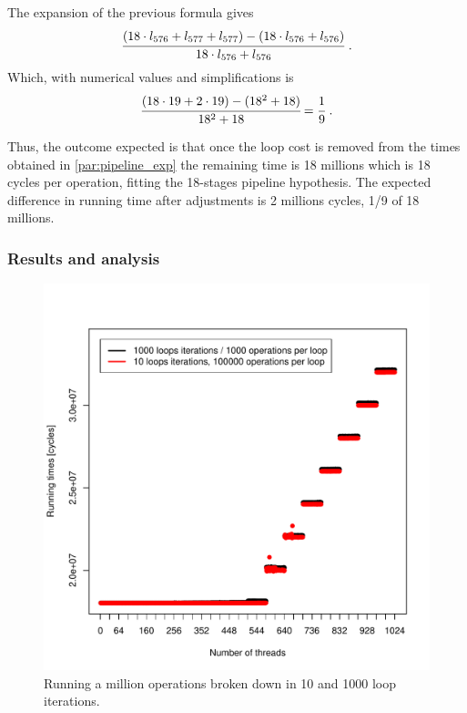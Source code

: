 \documentclass{report}
\def \scalingfactor{.8}
\begin{document}
    The expansion of the previous formula gives
    \[ \cfrac{(18\cdot l_{576} + l_{577} + l_{577}) - (18\cdot l_{576} + l_{576})}{18\cdot l_{576} + l_{576}} \text{  .}\]
    Which, with numerical values and simplifications is
    \[ \cfrac{(18\cdot 19 + 2\cdot 19) - (18^2 + 18)}{18^2 + 18} = \cfrac{1}{9}\text{  .}\] 

    Thus, the outcome expected is that once the loop cost is removed from the 
    times obtained in \ref{par:pipeline_exp} the remaining time is 18 millions
    which is 18 cycles per operation, fitting the 18-stages pipeline hypothesis.
    The expected difference in running time after adjustments is 2 millions cycles,
    1/9 of 18 millions.

	\subsubsection{Results and analysis}
    \begin{figure}[H]
		\centering
		\vspace{-20pt}
    			\includegraphics[width=\scalingfactor\linewidth]{"graphics/for-sizes-superpositions"}
		\vspace{-15pt}
		\captionsetup{justification=centering}
		\caption{Running a million operations broken down in 10 and 1000 loop iterations.}
        \label{fig:for-cost}
	\end{figure}
    
\end{document}
